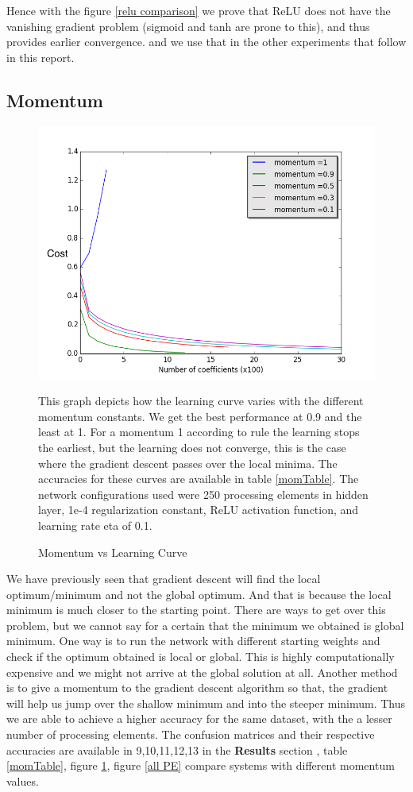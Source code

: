\documentclass[conference]{IEEEtran}
\begin{document}
 Hence with the figure \ref{relu comparison} we prove that ReLU does not have the vanishing gradient problem (sigmoid and tanh are prone to this), and thus provides earlier convergence. and we use that in the other experiments that follow in this report.


\subsection{Momentum}

\begin{figure}[h!]
\centering
\includegraphics[scale=0.45]{momentumVsAccuracy.png}
\caption{Momentum vs Learning Curve}
\label{momVSacc}
\footnotesize{This graph depicts how the learning curve varies with the different momentum constants. We get the best performance at 0.9 and the least at 1. For a momentum 1 according to rule the learning stops the earliest, but the learning does not converge, this is the case where the gradient descent passes over the local minima. The accuracies for these curves are available in table \ref{momTable}. The network configurations used were 250 processing elements in hidden layer, 1e-4 regularization constant, ReLU activation function, and learning rate eta of 0.1.}
\end{figure}

We have previously seen that gradient descent will find the local optimum/minimum and not the global optimum. And that is because the local minimum is much closer to the starting point. There are ways to get over this problem, but we cannot say for a certain that the minimum we obtained is global minimum. One way is to run the network with different starting weights and check if the optimum obtained is local or global. This is highly computationally expensive and we might not arrive at the global solution at all. Another method is to give a momentum to the gradient descent algorithm so that, the gradient will help us jump over the shallow minimum and into the steeper minimum. Thus we are able to achieve a higher accuracy for the same dataset, with the a lesser number of processing elements. The confusion matrices and their respective accuracies are available in 9,10,11,12,13  in the \textbf{Results} section , table \ref{momTable},  figure \ref{momVSacc}, figure \ref{all PE} compare systems with different momentum values. 
\end{document}
